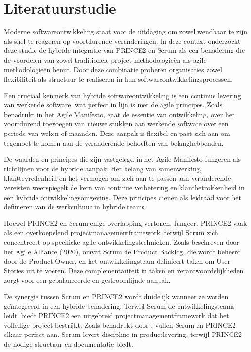 \documentclass[dutch]{hogent-article}
\begin{document}
\section{Literatuurstudie}%
\label{sec:literatuurstudie}

Moderne softwareontwikkeling staat voor de uitdaging om zowel wendbaar te zijn als snel te reageren op voortdurende veranderingen. In deze context onderzoekt deze studie de hybride integratie van PRINCE2 en Scrum als een benadering die de voordelen van zowel traditionele project methodologieën als agile methodologieën benut. Door deze combinatie proberen organisaties zowel flexibiliteit als structuur te realiseren in hun softwareontwikkelingsprocessen.
\newline

Een cruciaal kenmerk van hybride softwareontwikkeling is een continue levering van werkende software, wat perfect in lijn is met de agile principes. Zoals \textcite{PoniszewskaMaranda2022} benadrukt in het Agile Manifesto, gaat de essentie van ontwikkeling, over het voortdurend toevoegen van nieuwe stukken aan werkende software over een periode van weken of maanden. Deze aanpak is flexibel en past zich aan om tegemoet te komen aan de veranderende behoeften van belanghebbenden.
\newline

De waarden en principes die zijn vastgelegd in het Agile Manifesto fungeren als richtlijnen voor de hybride aanpak. Het belang van samenwerking, klanttevredenheid en het vermogen om zich aan te passen aan veranderende vereisten \textcite{Fowler2020} weerspiegelt de kern van continue verbetering en klantbetrokkenheid in een hybride ontwikkelingsomgeving. Deze principes dienen als leidraad voor het definiëren van de werkcultuur in hybride teams.
\newline

Hoewel PRINCE2 en Scrum enige overlapping vertonen, fungeert PRINCE2 vaak als een overkoepelend projectmanagementframework, terwijl Scrum zich concentreert op specifieke agile ontwikkelingstechnieken. Zoals beschreven door het Agile Alliance (2020), omvat Scrum de Product Backlog, die wordt beheerd door de Product Owner, en het ontwikkelingsteam definieert taken om User Stories uit te voeren. Deze complementariteit in taken en verantwoordelijkheden zorgt voor een gebalanceerde en gestroomlijnde aanpak.
\newline

De synergie tussen Scrum en PRINCE2 wordt duidelijk wanneer ze worden geïntegreerd in een hybride benadering. Terwijl Scrum de ontwikkelingsteams leidt, biedt PRINCE2 een uitgebreid projectmanagementframework dat het volledige project bestrijkt. Zoals benadrukt door \textcite{PoniszewskaMaranda2022}, vullen Scrum en PRINCE2 elkaar perfect aan. Scrum levert discipline in productlevering, terwijl PRINCE2 de nodige structuur en documentatie biedt.
\newline
\end{document}
